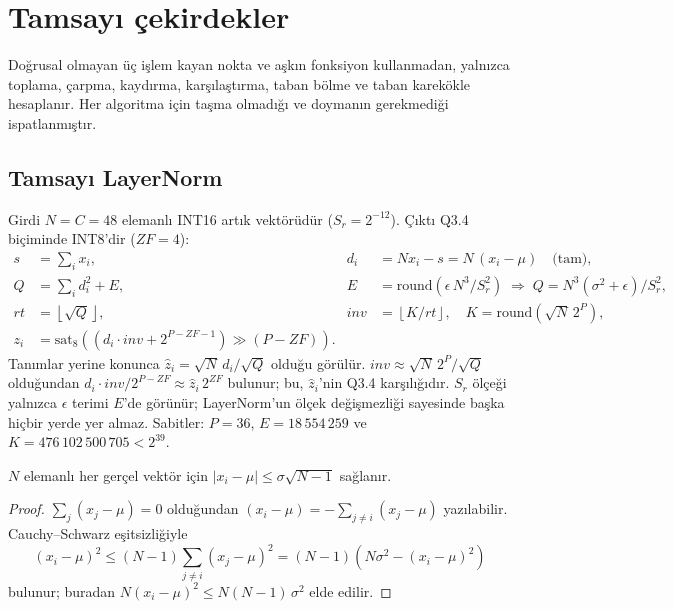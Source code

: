 \section{Tamsayı çekirdekler}\label{sec:cekirdek}

Doğrusal olmayan üç işlem kayan nokta ve aşkın fonksiyon kullanmadan, yalnızca toplama, çarpma, kaydırma, karşılaştırma, taban bölme ve taban karekökle hesaplanır. Her algoritma için taşma olmadığı ve doymanın gerekmediği ispatlanmıştır.

\subsection{Tamsayı LayerNorm}
Girdi $N = C = 48$ elemanlı INT16 artık vektörüdür ($S_r = 2^{-12}$). Çıktı Q3.4 biçiminde INT8'dir ($ZF = 4$):
\begin{equation}
\begin{aligned}
  s &= \textstyle\sum_{i} x_i, & d_i &= N x_i - s = N\,(x_i - \mu) \quad \text{(tam)}, \\
  Q &= \textstyle\sum_i d_i^2 + E, & E &= \mathrm{round}\left(\epsilon\, N^3 / S_r^2\right) \;\Rightarrow\; Q = N^3(\sigma^2+\epsilon)/S_r^2, \\
  rt &= \left\lfloor \sqrt{Q} \right\rfloor, & inv &= \left\lfloor K / rt \right\rfloor, \quad K = \mathrm{round}\left(\sqrt{N}\, 2^{P}\right), \\
  z_i &= \mathrm{sat}_8\left( \left(d_i \cdot inv + 2^{P-ZF-1}\right) \gg (P - ZF) \right).
\end{aligned}
\end{equation}
Tanımlar yerine konunca $\hat z_i = \sqrt N\, d_i/\sqrt Q$ olduğu görülür. $inv \approx \sqrt N\, 2^P/\sqrt Q$ olduğundan $d_i\cdot inv/2^{P-ZF} \approx \hat z_i\, 2^{ZF}$ bulunur; bu, $\hat z_i$'nin Q3.4 karşılığıdır. $S_r$ ölçeği yalnızca $\epsilon$ terimi $E$'de görünür; LayerNorm'un ölçek değişmezliği sayesinde başka hiçbir yerde yer almaz. Sabitler: $P = 36$, $E = 18\,554\,259$ ve $K = 476\,102\,500\,705 < 2^{39}$.

\begin{onerme}\label{on:samuelson}
$N$ elemanlı her gerçel vektör için $|x_i - \mu| \le \sigma\sqrt{N-1}$ sağlanır.
\end{onerme}
\begin{proof}
$\sum_j (x_j - \mu) = 0$ olduğundan $(x_i-\mu) = -\sum_{j\ne i}(x_j-\mu)$ yazılabilir. Cauchy--Schwarz eşitsizliğiyle
\[
  (x_i - \mu)^2 \le (N-1) \sum_{j \ne i} (x_j - \mu)^2 = (N-1)\left( N\sigma^2 - (x_i - \mu)^2 \right)
\]
bulunur; buradan $N (x_i - \mu)^2 \le N (N-1)\, \sigma^2$ elde edilir.
\end{proof}

